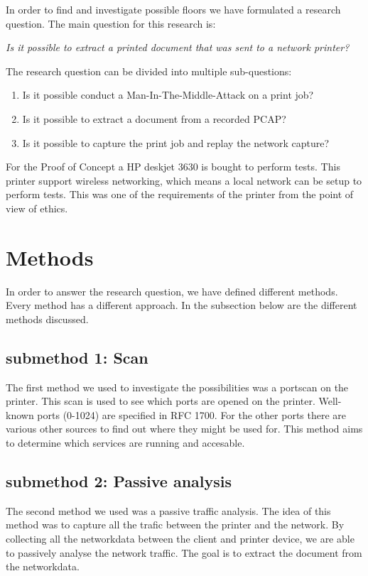 \documentclass[a4paper]{article}
\begin{document}
In order to find and investigate possible floors we have formulated a research question. The main question for this research is: 
\begin{center}
\textit{Is it possible to extract a printed document that was sent to a network printer?}
\end{center}
The research question can be divided into multiple sub-questions:
\begin{enumerate}
\item Is it possible conduct a Man-In-The-Middle-Attack on a print job?
\item Is it possible to extract a document from a recorded PCAP?
\item Is it possible to capture the print job and replay the network capture?
\end{enumerate}


For the Proof of Concept a HP deskjet 3630 is bought to perform tests. This printer support wireless networking, which means a local network can be setup to perform tests. This was one of the requirements of the printer from the point of view of ethics. 


\section{Methods} 
In order to answer the research question, we have defined different methods. Every method has a different approach. In the subsection below are the different methods discussed.

\subsection{submethod 1: Scan}
The first method we used to investigate the possibilities was a portscan on the printer. This scan is used to see which ports are opened on the printer. Well-known ports (0-1024) are specified in RFC 1700. For the other ports there are various other sources to find out where they might be used for. This method aims to determine which services are running and accesable. 

\subsection{submethod 2: Passive analysis}
The second method we used was a passive traffic analysis. The idea of this method was to capture all the trafic between the printer and the network. By collecting all the networkdata between the client and printer device, we are able to passively analyse the network traffic. The goal is to extract the document from the networkdata. \\
\end{document}
